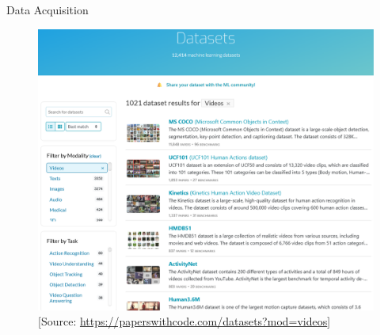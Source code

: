 \begin{frame}[allowframebreaks]{Data Acquisition}
\begin{figure}
        \includegraphics[width=1\textwidth,height=0.83\textheight,keepaspectratio]{images/video/dataset.png}
        \caption*{[Source: \url{https://paperswithcode.com/datasets?mod=videos}]}
    \end{figure}
\end{frame}


